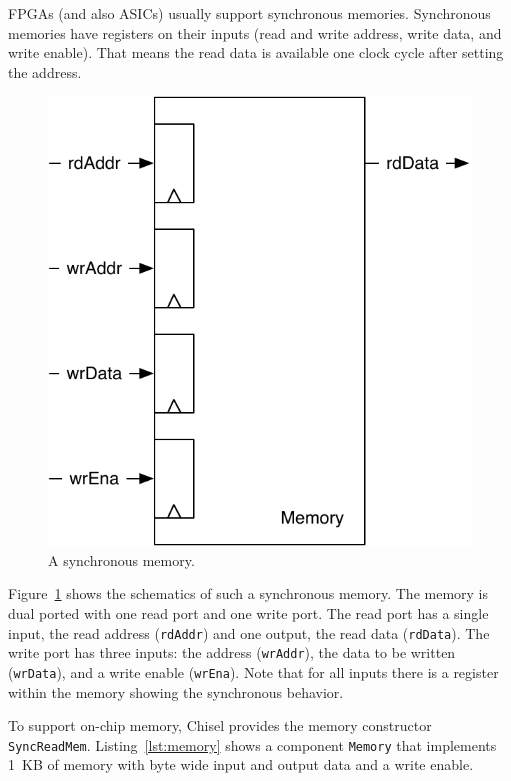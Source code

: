 \documentclass[%
    10pt,
    headinclude, footexclude,
    openright, %
    notitlepage,
    cleardoubleempty,
    headsepline,
    pointlessnumbers,
    bibtotoc, idxtotoc,
    ]{scrbook}
\newcommand{\code}[1]{{\small{\texttt{#1}}}}
\newcommand{\scale}{0.7}
\begin{document}
FPGAs (and also ASICs) usually support synchronous memories.
Synchronous memories have registers on their inputs (read and write address, write data,
and write enable). That means the read data is available one clock
cycle after setting the address.

\begin{figure}
  \centering
  \includegraphics[scale=\scale]{figures/memory}
  \caption{A synchronous memory.}
  \label{fig:memory}
\end{figure}

Figure~\ref{fig:memory} shows the schematics of such a synchronous memory.
The memory is dual ported with one read port and one write port.
The read port has a single input, the read address (\code{rdAddr}) and
one output, the read data (\code{rdData}).
The write port has three inputs: the address (\code{wrAddr}), the data
to be written (\code{wrData}), and a write enable (\code{wrEna}).
Note that for all inputs there is a register within the memory showing the
synchronous behavior.

To support on-chip memory, Chisel provides the memory constructor \code{SyncReadMem}.
Listing~\ref{lst:memory} shows a component \code{Memory} that implements
1~KB of memory with byte wide input and output data and a write enable.
\end{document}
